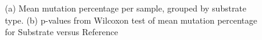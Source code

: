 \begin{figure}[h!]
    \centering
    \caption{(a) Mean mutation percentage per sample, grouped by substrate type. (b) p-values from Wilcoxon test of mean mutation percentage for Substrate versus Reference}
    \label{both_mean_samples_susbtrates}
\end{figure}

% 
% 

